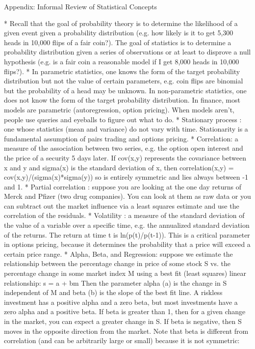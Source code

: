  Appendix: Informal Review of Statistical Concepts

    * Recall that the goal of probability theory is to determine the likelihood of a given event given a probability distribution (e.g. how likely is it to get 5,300 heads in 10,000 flips of a fair coin?).
      The goal of statistics is to determine a probability distribution given a series of observations or at least to disprove a null hypothesis (e.g. is a fair coin a reasonable model if I get 8,000 heads in 10,000 flips?).
    * In parametric statistics, one knows the form of the target probability distribution but not the value of certain parameters, e.g. coin flips are binomial but the probability of a head may be unknown.
      In non-parametric statistics, one does not know the form of the target probability distribution.
      In finance, most models are parametric (autoregression, option pricing). When models aren't, people use queries and eyeballs to figure out what to do.
    * Stationary process : one whose statistics (mean and variance) do not vary with time. Stationarity is a fundamental assumption of pairs trading and options pricing.
    * Correlation: a measure of the association between two series, e.g. the option open interest and the price of a security 5 days later. If cov(x,y) represents the covariance between x and y and sigma(x) is the standard deviation of x, then
      correlation(x,y) = cov(x,y)/(sigma(x)*sigma(y))
      so is entirely symmetric and lies always between -1 and 1.
    * Partial correlation : suppose you are looking at the one day returns of Merck and Pfizer (two drug companies). You can look at them as raw data or you can subtract out the market influence via a least squares estimate and use the correlation of the residuals.
    * Volatility : a measure of the standard deviation of the value of a variable over a specific time, e.g. the annualized standard deviation of the returns. The return at time t is ln(p(t)/p(t-1)). This is a critical parameter in options pricing, because it determines the probability that a price will exceed a certain price range.
    * Alpha, Beta, and Regression: suppose we estimate the relationship between the percentage change in price of some stock S vs. the percentage change in some market index M using a best fit (least squares) linear relationship:
      s = a + bm
      Then the parameter alpha (a) is the change in S independent of M and beta (b) is the slope of the best fit line. A riskless investment has a positive alpha and a zero beta, but most investments have a zero alpha and a positive beta. If beta is greater than 1, then for a given change in the market, you can expect a greater change in S. If beta is negative, then S moves in the opposite direction from the market. Note that beta is different from correlation (and can be arbitrarily large or small) because it is not symmetric:
